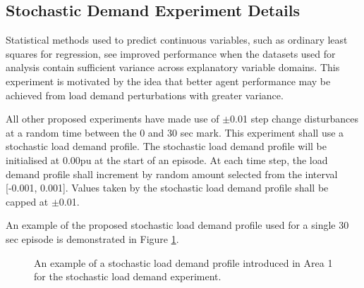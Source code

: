 \subsection{Stochastic Demand Experiment Details}\label{sec:stochastic}
Statistical methods used to predict continuous variables, such as ordinary least squares for regression, see improved performance when the datasets used for analysis contain sufficient variance across explanatory variable domains. This experiment is motivated by the idea that better agent performance may be achieved from load demand perturbations with greater variance.

All other proposed experiments have made use of $\pm$0.01 step change disturbances at a random time between the 0 and 30 sec mark. This experiment shall use a stochastic load demand profile. The stochastic load demand profile will be initialised at 0.00pu at the start of an episode. At each time step, the load demand profile shall increment by random amount selected from the interval [-0.001, 0.001]. Values taken by the stochastic load demand profile shall be capped at $\pm$0.01.

An example of the proposed stochastic load demand profile used for a single 30 sec episode is demonstrated in Figure \ref{fig:stochastic_signal}.

\begin{figure}[h]
	\centering
	
	\caption[Stochastic load demand profile]{An example of a stochastic load demand profile introduced in Area 1 for the stochastic load demand experiment.}\label{fig:stochastic_signal}
\end{figure}

